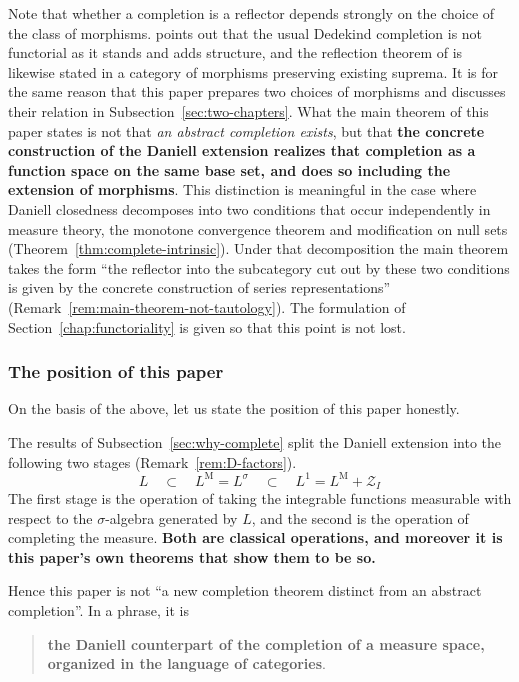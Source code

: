Note that whether a completion is a reflector depends strongly on the choice of
the class of morphisms.
\cite{BMO} points out that the usual Dedekind completion is not functorial as it
stands and adds structure, and the reflection theorem of
\cite{AvilesBilokopytov} is likewise stated in a category of morphisms
preserving existing suprema.
It is for the same reason that this paper prepares two choices of morphisms and
discusses their relation in
Subsection~\ref{sec:two-chapters}.
What the main theorem of this paper states is not that \emph{an abstract
completion exists}, but that \textbf{the concrete construction of the Daniell
extension realizes that completion as a function space on the same base set, and
does so including the extension of morphisms}.
This distinction is meaningful in the case where Daniell closedness decomposes
into two conditions that occur independently in measure theory, the monotone
convergence theorem and modification on null sets
(Theorem~\ref{thm:complete-intrinsic}).
Under that decomposition the main theorem takes the form ``the reflector into the
subcategory cut out by these two conditions is given by the concrete
construction of series representations''
(Remark~\ref{rem:main-theorem-not-tautology}).
The formulation of Section~\ref{chap:functoriality} is given so that this point
is not lost.

\subsubsection{The position of this paper}\label{sec:our-position}

On the basis of the above, let us state the position of this paper honestly.

The results of Subsection~\ref{sec:why-complete} split the Daniell extension
into the following two stages
(Remark~\ref{rem:D-factors}).
\[
  L
  \quad\subset\quad
  L^{\mathrm{M}}=L^{\sigma}
  \quad\subset\quad
  L^1=L^{\mathrm{M}}+\mathcal{Z}_I
\]
The first stage is the operation of taking the integrable functions measurable
with respect to the $\sigma$-algebra generated by $L$, and the second is the
operation of completing the measure.
\textbf{Both are classical operations, and moreover it is this paper's own
theorems that show them to be so.}

Hence this paper is not ``a new completion theorem distinct from an abstract
completion''. In a phrase, it is

\begin{quote}
  \textbf{the Daniell counterpart of the completion of a measure space,
  organized in the language of categories}.
\end{quote}

